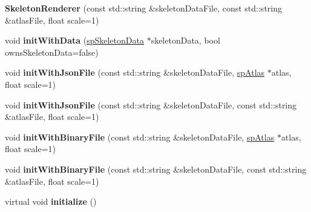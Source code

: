 \begin{DoxyCompactItemize}
{\bfseries Skeleton\+Renderer} (const std\+::string \&skeleton\+Data\+File, const std\+::string \&atlas\+File, float scale=1)
\item 
\mbox{\label{classspine_1_1SkeletonRenderer_a49c9e9dc79bdc5b3a6dd2dc26469476f}} 
void {\bfseries init\+With\+Data} (\hyperlink{structspSkeletonData}{sp\+Skeleton\+Data} $\ast$skeleton\+Data, bool owns\+Skeleton\+Data=false)
\item 
\mbox{\label{classspine_1_1SkeletonRenderer_a612e98998ac3255521e9f99184f9cb39}} 
void {\bfseries init\+With\+Json\+File} (const std\+::string \&skeleton\+Data\+File, \hyperlink{structspAtlas}{sp\+Atlas} $\ast$atlas, float scale=1)
\item 
\mbox{\label{classspine_1_1SkeletonRenderer_ab50c8362c65e2ef4961dbcf40b5950cf}} 
void {\bfseries init\+With\+Json\+File} (const std\+::string \&skeleton\+Data\+File, const std\+::string \&atlas\+File, float scale=1)
\item 
\mbox{\label{classspine_1_1SkeletonRenderer_ae2fe2e496dfcc21ecd29919343020c2f}} 
void {\bfseries init\+With\+Binary\+File} (const std\+::string \&skeleton\+Data\+File, \hyperlink{structspAtlas}{sp\+Atlas} $\ast$atlas, float scale=1)
\item 
\mbox{\label{classspine_1_1SkeletonRenderer_a729453349e2fa3d637934e4aa9b583b7}} 
void {\bfseries init\+With\+Binary\+File} (const std\+::string \&skeleton\+Data\+File, const std\+::string \&atlas\+File, float scale=1)
\item 
\mbox{\label{classspine_1_1SkeletonRenderer_a7d40707ca12a921dfa4c55b01a937a3e}} 
virtual void {\bfseries initialize} ()
\end{DoxyCompactItemize}
